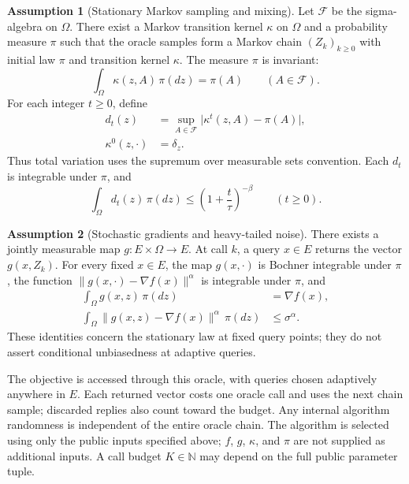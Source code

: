 \documentclass[10pt]{article}
\theoremstyle{definition}
\newtheorem{assumption}{Assumption}
\begin{document}
\begin{assumption}[Stationary Markov sampling and mixing]
Let $\mathcal{F}$ be the sigma-algebra on $\Omega$. There exist a Markov transition kernel $\kappa$ on $\Omega$ and a probability measure $\pi$ such that the oracle samples form a Markov chain $(Z_k)_{k\geq 0}$ with initial law $\pi$ and transition kernel $\kappa$. The measure $\pi$ is invariant:
\begin{equation}
\int_\Omega \kappa(z,A)\,\pi(dz)=\pi(A)
\qquad (A\in\mathcal{F}).
\end{equation}
For each integer $t\geq 0$, define
\begin{equation}
\begin{aligned}
d_t(z)&=\sup_{A\in\mathcal{F}}
\bigl|\kappa^t(z,A)-\pi(A)\bigr|,\\
\kappa^0(z,\cdot)&=\delta_z.
\end{aligned}
\end{equation}
Thus total variation uses the supremum over measurable sets convention. Each $d_t$ is integrable under $\pi$, and
\begin{equation}
\int_\Omega d_t(z)\,\pi(dz)
\leq \left(1+\frac{t}{\tau}\right)^{-\beta}
\qquad (t\geq 0).
\end{equation}
\end{assumption}

\begin{assumption}[Stochastic gradients and heavy-tailed noise]
There exists a jointly measurable map $g:E\times\Omega\to E$. At call $k$, a query $x\in E$ returns the vector $g(x,Z_k)$. For every fixed $x\in E$, the map $g(x,\cdot)$ is Bochner integrable under $\pi$, the function $\|g(x,\cdot)-\nabla f(x)\|^\alpha$ is integrable under $\pi$, and
\begin{align}
\int_\Omega g(x,z)\,\pi(dz)&=\nabla f(x),\\
\int_\Omega \|g(x,z)-\nabla f(x)\|^\alpha\,\pi(dz)
&\leq \sigma^\alpha.
\end{align}
These identities concern the stationary law at fixed query points; they do not assert conditional unbiasedness at adaptive queries.
\end{assumption}

The objective is accessed through this oracle, with queries chosen adaptively anywhere in $E$. Each returned vector costs one oracle call and uses the next chain sample; discarded replies also count toward the budget. Any internal algorithm randomness is independent of the entire oracle chain. The algorithm is selected using only the public inputs specified above; $f$, $g$, $\kappa$, and $\pi$ are not supplied as additional inputs. A call budget $K\in\mathbb{N}$ may depend on the full public parameter tuple.
\end{document}
